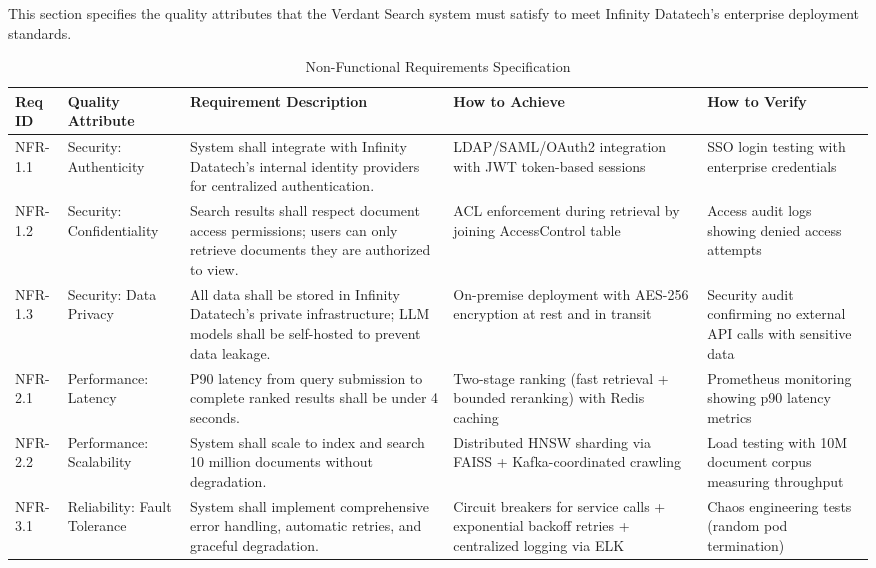 This section specifies the quality attributes that the Verdant Search system must satisfy to meet Infinity Datatech's enterprise deployment standards.

\begin{table}[H]
\centering
\caption{Non-Functional Requirements Specification}
\label{tab:nfr}
\small
\renewcommand{\arraystretch}{1.4}
\begin{tabularx}{\textwidth}{|p{}|p{}|p{}|p{}|p{}|}
\hline
\textbf{Req ID} & \textbf{Quality Attribute} & \textbf{Requirement Description} & \textbf{How to Achieve} & \textbf{How to Verify} \\
\hline
NFR-1.1 & Security: Authenticity & System shall integrate with Infinity Datatech's internal identity providers for centralized authentication. & LDAP/SAML/OAuth2 integration with JWT token-based sessions & SSO login testing with enterprise credentials \\
\hline
NFR-1.2 & Security: Confidentiality & Search results shall respect document access permissions; users can only retrieve documents they are authorized to view. & ACL enforcement during retrieval by joining AccessControl table & Access audit logs showing denied access attempts \\
\hline
NFR-1.3 & Security: Data Privacy & All data shall be stored in Infinity Datatech's private infrastructure; LLM models shall be self-hosted to prevent data leakage. & On-premise deployment with AES-256 encryption at rest and in transit & Security audit confirming no external API calls with sensitive data \\
\hline
NFR-2.1 & Performance: Latency & P90 latency from query submission to complete ranked results shall be under 4 seconds. & Two-stage ranking (fast retrieval + bounded reranking) with Redis caching & Prometheus monitoring showing p90 latency metrics \\
\hline
NFR-2.2 & Performance: Scalability & System shall scale to index and search 10 million documents without degradation. & Distributed HNSW sharding via FAISS + Kafka-coordinated crawling & Load testing with 10M document corpus measuring throughput \\
\hline
NFR-3.1 & Reliability: Fault Tolerance & System shall implement comprehensive error handling, automatic retries, and graceful degradation. & Circuit breakers for service calls + exponential backoff retries + centralized logging via ELK & Chaos engineering tests (random pod termination) \\

\end{tabularx}
\end{table}
